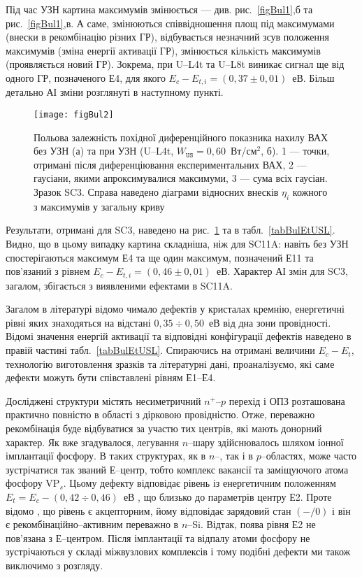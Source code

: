 Під час УЗН картина максимумів змінюється --- див. рис.~\ref{figBul1},б та рис.~\ref{figBul1},в.
А саме, змінюються співвідношення площ під максимумами (внески в рекомбінацію різних ГР),
відбувається незначний зсув положення максимумів (зміна енергії активації ГР),
змінюється кількість максимумів (проявляється новий ГР).
Зокрема, при U--L4t та U--L8t виникає сигнал ще від одного ГР,
позначеного Е4, для якого $E_c-E_{t,i}=(0,37\pm0,01)$~еВ.
Більш детально АІ зміни розглянуті в наступному пункті.

\begin{figure}
\center
\texttt{[image: figBul2]}
\caption{\label{figBul2}
Польова залежність похідної диференційного показника нахилу ВАХ без УЗН (а)
та при УЗН (U--L4t,  $W_\mathtt{US}=0,60$~Вт/см$^2$, б).
1 --- точки, отримані після диференціювання експериментальних ВАХ,
2 --- гаусіани, якими апроксимувалися максимуми,
3 --- сума всіх гаусіан.
Зразок SC3.
Справа наведено діаграми відносних внесків $\eta_i$ кожного з максимумів у загальну криву
}%
\end{figure}

Результати, отримані для SC3, наведено на рис.~\ref{figBul2} та в табл.~\ref{tabBulEtUSL}.
Видно, що в цьому випадку картина складніша, ніж для SC11A:
навіть без УЗН спостерігаються максимум Е4 та
 ще один максимум, позначений Е11 та пов'язаний з рівнем $E_c-E_{t,i}=(0,46\pm0,01)$~еВ.
Характер АІ змін для SC3, загалом, збігається з виявленими ефектами в SC11A.






Загалом в літературі відомо чимало дефектів у кристалах кремнію, енергетичні рівні яких знаходяться на відстані
$0,35\div0,50$~еВ від дна зони провідності.
Відомі значення енергій активації та відповідні конфігурації дефектів наведено в правій частині табл.~\ref{tabBulEtUSL}.
Спираючись на отримані величини $E_c-E_t$, технологію виготовлення зразків та літературні дані,
проаналізуємо, які саме дефекти можуть бути співставлені рівням Е1--Е4.

Досліджені структури містять несиметричний $n^+$--$p$ перехід і ОПЗ розташована практично повністю в області з дірковою провідністю.
Отже, переважно рекомбінація буде відбуватися за участю тих центрів, які мають донорний характер.
Як вже згадувалося, легування $n$--шару здійснювалось шляхом іонної імплантації фосфору.
В таких структурах, як в $n$--, так і в $p$--областях, може часто зустрічатися так званий Е--центр,
тобто комплекс вакансії та заміщуючого атома фосфору VP$_s$.
Цьому дефекту відповідає  рівень із енергетичним положенням $E_t=E_c-(0,42\div0,46)$~еВ \cite{VI:Luc,Karazh,Kuchinskii,Ecentre:2005}, що близько до параметрів центру Е2.
Проте відомо \cite{Kuchinskii,Ecentre:2005}, що рівень є акцепторним, йому відповідає зарядовий стан  $(-/0)$ і він є рекомбінаційно--активним переважно в $n$--Si.
Відтак, поява рівня Е2 не пов'язана з Е--центром.
Після імплантації та відпалу атоми фосфору не зустрічаються у складі міжвузлових комплексів \cite{ChelyadFTT} і тому подібні дефекти ми також виключимо з розгляду.

